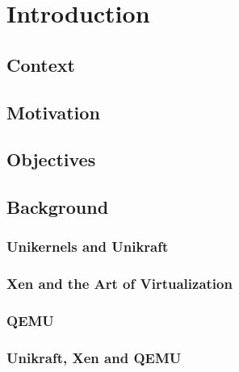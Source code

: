 \chapter{Introduction}
\label{chapter:intro}

\section{Context}
\label{sec:context}

\section{Motivation}
\label{sec:motivation}

\section{Objectives}
\label{sec:objectives}

\section{Background}
\label{sec:background}

\subsection{Unikernels and Unikraft}
\label{subsec:unikernels-unikraft}

\subsection{Xen and the Art of Virtualization \cite{art-of-xen}}
\label{subsec:art-of-virtualization}

\subsection{QEMU}
\label{subsec:qemu}

\subsection{Unikraft, Xen and QEMU}
\label{subsec:unikraft-xen}
